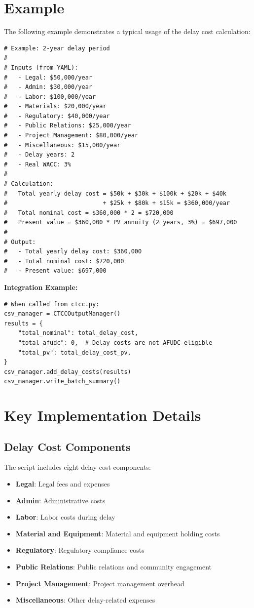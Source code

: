 \documentclass[ctcc_full_documentation.tex]{subfiles}
\begin{document}
\section{Example}

The following example demonstrates a typical usage of the delay cost calculation:

\begin{lstlisting}
# Example: 2-year delay period
# 
# Inputs (from YAML):
#   - Legal: $50,000/year
#   - Admin: $30,000/year
#   - Labor: $100,000/year
#   - Materials: $20,000/year
#   - Regulatory: $40,000/year
#   - Public Relations: $25,000/year
#   - Project Management: $80,000/year
#   - Miscellaneous: $15,000/year
#   - Delay years: 2
#   - Real WACC: 3%
#
# Calculation:
#   Total yearly delay cost = $50k + $30k + $100k + $20k + $40k 
#                           + $25k + $80k + $15k = $360,000/year
#   Total nominal cost = $360,000 * 2 = $720,000
#   Present value = $360,000 * PV annuity (2 years, 3%) = $697,000
#
# Output:
#   - Total yearly delay cost: $360,000
#   - Total nominal cost: $720,000
#   - Present value: $697,000
\end{lstlisting}

\textbf{Integration Example:}

\begin{lstlisting}
# When called from ctcc.py:
csv_manager = CTCCOutputManager()
results = {
    "total_nominal": total_delay_cost,
    "total_afudc": 0,  # Delay costs are not AFUDC-eligible
    "total_pv": total_delay_cost_pv,
}
csv_manager.add_delay_costs(results)
csv_manager.write_batch_summary()
\end{lstlisting}

\section{Key Implementation Details}

\subsection{Delay Cost Components}

The script includes eight delay cost components:
\begin{itemize}
    \item \textbf{Legal}: Legal fees and expenses
    \item \textbf{Admin}: Administrative costs
    \item \textbf{Labor}: Labor costs during delay
    \item \textbf{Material and Equipment}: Material and equipment holding costs
    \item \textbf{Regulatory}: Regulatory compliance costs
    \item \textbf{Public Relations}: Public relations and community engagement
    \item \textbf{Project Management}: Project management overhead
    \item \textbf{Miscellaneous}: Other delay-related expenses
\end{itemize}
\end{document}
